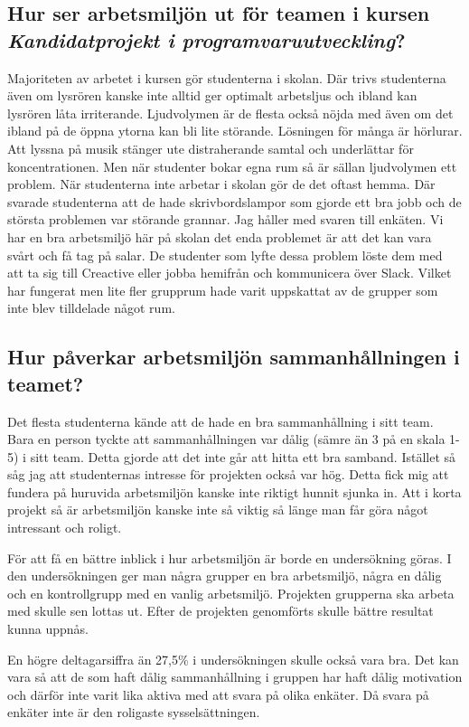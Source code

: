 \subsection{Hur ser arbetsmiljön ut för teamen i kursen \textit{Kandidatprojekt i programvaruutveckling}?}
Majoriteten av arbetet i kursen gör studenterna i skolan. Där trivs studenterna även om lysrören kanske inte alltid ger optimalt arbetsljus och ibland kan lysrören låta irriterande. Ljudvolymen är de flesta också nöjda med även om det ibland på de öppna ytorna kan bli lite störande. Lösningen för många är hörlurar. Att lyssna på musik stänger ute distraherande samtal och underlättar för koncentrationen. Men när studenter bokar egna rum så är sällan ljudvolymen ett problem. När studenterna inte arbetar i skolan gör de det oftast hemma. Där svarade studenterna att de hade skrivbordslampor som gjorde ett bra jobb och de största problemen var störande grannar. Jag håller med svaren till enkäten. Vi har en bra arbetsmiljö här på skolan det enda problemet är att det kan vara svårt och få tag på salar. De studenter som lyfte dessa problem löste dem med att ta sig till Creactive eller jobba hemifrån och kommunicera över Slack. Vilket har fungerat men lite fler grupprum hade varit uppskattat av de grupper som inte blev tilldelade något rum. 

\subsection{Hur påverkar arbetsmiljön sammanhållningen i teamet?}
Det flesta studenterna kände att de hade en bra sammanhållning i sitt team. Bara en person tyckte att sammanhållningen var dålig (sämre än 3 på en skala 1-5) i sitt team. Detta gjorde att det inte går att hitta ett bra samband. Istället så såg jag att studenternas intresse för projekten också var hög. Detta fick mig att fundera på huruvida arbetsmiljön kanske inte riktigt hunnit sjunka in. Att i korta projekt så är arbetsmiljön kanske inte så viktig så länge man får göra något intressant och roligt.

För att få en bättre inblick i hur arbetsmiljön är borde en undersökning göras. I den undersökningen ger man några grupper en bra arbetsmiljö, några en dålig och en kontrollgrupp med en vanlig arbetsmiljö. Projekten grupperna ska arbeta med skulle sen lottas ut. Efter de projekten genomförts skulle bättre resultat kunna uppnås. 

En högre deltagarsiffra än 27,5\% i undersökningen skulle också vara bra. Det kan vara så att de som haft dålig sammanhållning i gruppen har haft dålig motivation och därför inte varit lika aktiva med att svara på olika enkäter. Då svara på enkäter inte är den roligaste sysselsättningen.

